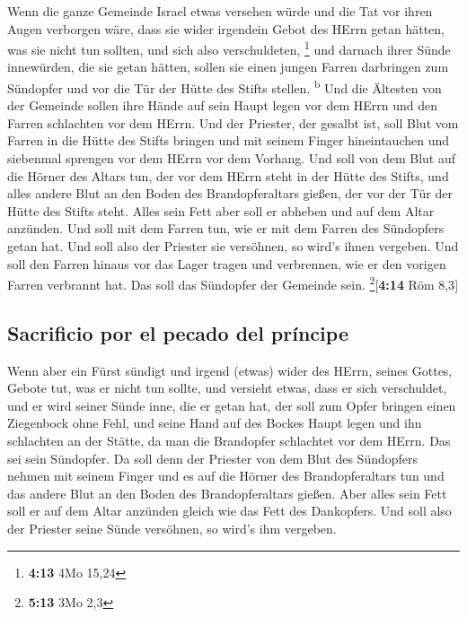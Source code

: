  Wenn die ganze Gemeinde Israel etwas versehen würde und
die Tat vor ihren Augen verborgen wäre, dass sie wider irgendein Gebot
des HErrn getan hätten, was sie nicht tun sollten, und sich also
verschuldeten, \footnote{\textbf{4:13} 4Mo 15,24}  und
darnach ihrer Sünde innewürden, die sie getan hätten, sollen sie einen
jungen Farren darbringen zum Sündopfer und vor die Tür der Hütte des
Stifts stellen. \textsuperscript{b}  Und die Ältesten von
der Gemeinde sollen ihre Hände auf sein Haupt legen vor dem HErrn und
den Farren schlachten vor dem HErrn.  Und der Priester,
der gesalbt ist, soll Blut vom Farren in die Hütte des Stifts bringen
 und mit seinem Finger hineintauchen und siebenmal
sprengen vor dem HErrn vor dem Vorhang.  Und soll von dem
Blut auf die Hörner des Altars tun, der vor dem HErrn steht in der Hütte
des Stifts, und alles andere Blut an den Boden des Brandopferaltars
gießen, der vor der Tür der Hütte des Stifts steht. 
Alles sein Fett aber soll er abheben und auf dem Altar anzünden.
 Und soll mit dem Farren tun, wie er mit dem Farren des
Sündopfers getan hat. Und soll also der Priester sie versöhnen, so
wird's ihnen vergeben.  Und soll den Farren hinaus vor
das Lager tragen und verbrennen, wie er den vorigen Farren verbrannt
hat. Das soll das Sündopfer der Gemeinde sein.
\footnote{\textbf{5:13} 3Mo 2,3}{[}\textbf{4:14} Röm 8,3{]}

\hypertarget{sacrificio-por-el-pecado-del-pruxedncipe}{%
\subsection{Sacrificio por el pecado del
príncipe}\label{sacrificio-por-el-pecado-del-pruxedncipe}}

 Wenn aber ein Fürst sündigt und irgend (etwas) wider des
HErrn, seines Gottes, Gebote tut, was er nicht tun sollte, und versieht
etwas, dass er sich verschuldet,  und er wird seiner
Sünde inne, die er getan hat, der soll zum Opfer bringen einen
Ziegenbock ohne Fehl,  und seine Hand auf des Bockes
Haupt legen und ihn schlachten an der Stätte, da man die Brandopfer
schlachtet vor dem HErrn. Das sei sein Sündopfer.  Da
soll denn der Priester von dem Blut des Sündopfers nehmen mit seinem
Finger und es auf die Hörner des Brandopferaltars tun und das andere
Blut an den Boden des Brandopferaltars gießen.  Aber
alles sein Fett soll er auf dem Altar anzünden gleich wie das Fett des
Dankopfers. Und soll also der Priester seine Sünde versöhnen, so wird's
ihm vergeben.

